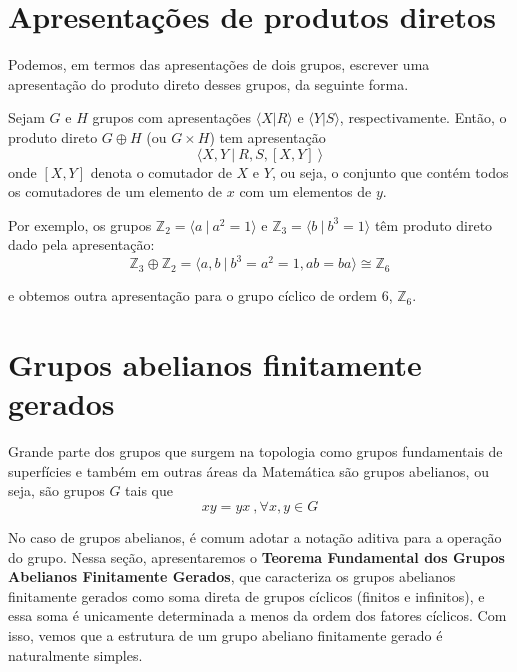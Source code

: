 	\section{Apresentações de produtos diretos}
	    Podemos, em termos das apresentações de dois grupos, escrever uma apresentação do produto direto 
	    desses grupos, da seguinte forma.
    	\begin{prop}
    	\label{apresentacao prod direto}
        	Sejam $G$ e $H$ grupos com apresentações $\langle X|R \rangle$ e $\langle Y|S \rangle$,
        	respectivamente. Então, o produto direto $G\oplus H$ (ou $G\times H$) tem apresentação
        	\begin{equation*}
        	    \langle X,Y \ | \ R,S, [X,Y] \ \rangle
        	\end{equation*}
        	onde $[X,Y]$ denota o comutador de $X$ e $Y$, ou seja, o conjunto que contém todos os 
        	comutadores de um elemento de $x$ com um elementos de $y$.
    	\end{prop}
    	\par\vspace{0.3cm} Por exemplo, os grupos $\mathbb{Z}_2 = \langle a\ | \ a^2=1 \rangle$ e 
    	$\mathbb{Z}_3 = \langle b\ | \ b^3=1 \rangle$ têm produto direto dado pela apresentação:
    	\begin{equation*}
    	    \mathbb{Z}_3\oplus\mathbb{Z}_2 = \langle a,b \ | \ b^3=a^2=1, ab = ba \rangle \cong \mathbb{Z}_6 
    	\end{equation*}
    	\par\vspace{0.3cm} e obtemos outra apresentação para o grupo cíclico de ordem $6$, $\mathbb{Z}_6$.
	\section{Grupos abelianos finitamente gerados}
    	Grande parte dos grupos que surgem na topologia como grupos fundamentais de superfícies e também 
    	em outras áreas da Matemática são grupos abelianos, ou seja, são grupos $G$ tais que
    	\begin{equation*}
    	    xy = yx\ , \forall x,y\in G
    	\end{equation*}
    	\par\vspace{0.3cm} No caso de grupos abelianos, é comum adotar a notação aditiva para a operação 
    	do grupo. Nessa seção, apresentaremos o \textbf{Teorema Fundamental dos Grupos Abelianos Finitamente
    	Gerados}, que caracteriza os grupos abelianos finitamente gerados como soma direta de grupos cíclicos
    	(finitos e infinitos), e essa soma é unicamente determinada a menos da ordem dos fatores cíclicos. 
    	Com isso, vemos que a estrutura de um grupo abeliano finitamente gerado é naturalmente simples.
    	
